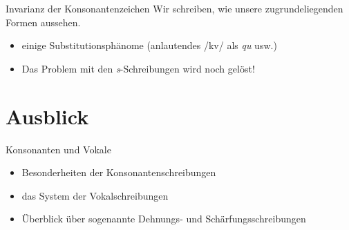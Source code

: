 \begin{frame}
  {Invarianz der Konsonantenzeichen}
  \pause
  \alert{Wir schreiben, wie unsere zugrundeliegenden Formen aussehen.}\\
  \pause
  \Zeile
  \centering
  \Zeile
  \pause
  \begin{itemize}[<+->]
    \item einige Substitutionsphänome (anlautendes /kv/ als \textit{qu} usw.)
    \item \alert{Das Problem mit den \textit{s}-Schreibungen wird noch gelöst!}
  \end{itemize}
\end{frame}


\section{Ausblick}


\begin{frame}
  {Konsonanten und Vokale}
  \onslide<+->
  \onslide<+->
  \begin{itemize}[<+->]
    \item Besonderheiten der Konsonantenschreibungen
    \item das System der Vokalschreibungen
    \item Überblick über sogenannte Dehnungs- und Schärfungsschreibungen
  \end{itemize}
\end{frame}
